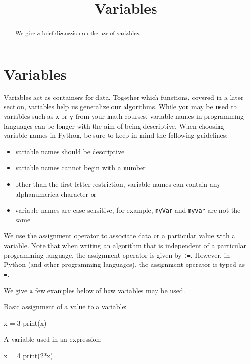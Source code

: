 \documentclass{ximera}
\title{Variables}
\begin{document}
  
\begin{abstract}  
We give a brief discussion on the use of variables.
\end{abstract}  
\maketitle

\section{Variables}

Variables act as containers for data. Together which functions, covered in a later section, variables help us generalize our algorithms. While you may be used to variables such as \verb|x| or \verb|y| from your math courses, variable names in programming languages can be longer with the aim of being descriptive. When choosing variable names in Python, be sure to keep in mind the following guidelines:

\begin{itemize}
	\item variable names should be descriptive
	\item variable names cannot begin with a number
	\item other than the first letter restriction, variable names can contain any alphanumerica character or \verb|_|
	\item variable names are case sensitive, for example, \verb|myVar| and \verb|myvar| are not the same
\end{itemize}

We use the assignment operator to associate data or a particular value with a variable. Note that when writing an algorithm that is independent of a particular programming language, the assignment operator is given by \verb|:=|. However, in Python (and other programming languages), the assignment operator is typed as \verb|=|.

We give a few examples below of how variables may be used.

Basic assignment of a value to a variable:

\begin{sageCell}
x = 3
print(x)
\end{sageCell}

A variable used in an expression:

\begin{sageCell}
x = 4
print(2*x)
\end{sageCell}
\end{document}
